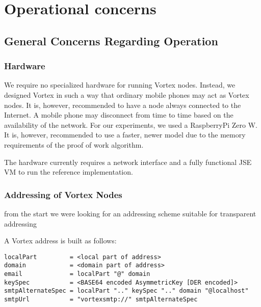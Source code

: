 \part{Operational concerns}\label{sec:operation}


\chapter{General Concerns Regarding Operation}
\section{Hardware}
We require no specialized hardware for running Vortex nodes. Instead, we designed Vortex in such a way that ordinary mobile phones may act as Vortex nodes. It is, however, recommended to have a node always connected to the Internet. A mobile phone may disconnect from time to time based on the availability of the network. For our experiments, we used a RaspberryPi Zero W. It is, however, recommended to use a faster, newer model due to the memory requirements of the proof of work algorithm. 

The hardware currently requires a network interface and a fully functional JSE VM to run the reference implementation.

\section{Addressing of Vortex Nodes}
from the start we were looking for an addressing scheme suitable for transparent addressing 

A Vortex address is built as follows: 

\begin{lstlisting}[language=EBNF]
localPart         = <local part of address>
domain            = <domain part of address>
email             = localPart "@" domain
keySpec           = <BASE64 encoded AsymmetricKey [DER encoded]>
smtpAlternateSpec = localPart ".." keySpec ".." domain "@localhost"
smtpUrl           = "vortexsmtp://" smtpAlternateSpec
\end{lstlisting}

